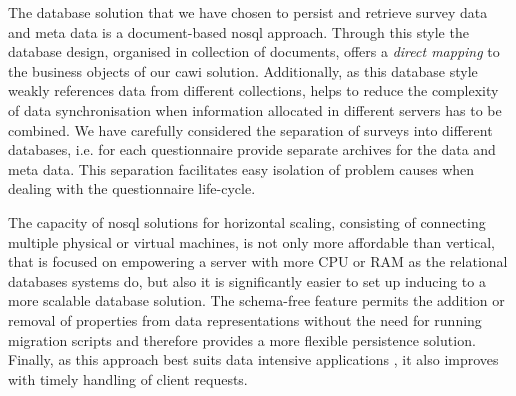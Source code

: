 	The database solution that we have chosen to persist and retrieve survey data and meta data is a document-based \gls{nosql} approach. Through this style the database design, organised in collection of documents, offers a \emph{direct mapping} to the business objects of our \gls{cawi} solution. Additionally, as this database style weakly references data from different collections, helps to reduce the complexity of data synchronisation when information allocated in different servers has to be combined. We have carefully considered the separation of surveys into different databases, i.e. for each questionnaire provide separate archives for the data and meta data. This separation facilitates easy isolation of problem causes when dealing with the questionnaire life-cycle.

	The capacity of \gls{nosql} solutions for horizontal scaling, consisting of connecting multiple physical or virtual machines, is not only more affordable than vertical, that is focused on empowering a server with more CPU or RAM as the relational databases systems do, but also it is significantly easier to set up inducing to a more scalable database solution. %
	The schema-free feature permits the addition or removal of properties from data representations without the need for running migration scripts \cite{art:padhy11} and therefore provides a more flexible persistence solution. Finally, as this approach best suits data intensive applications \cite{proc:gyorodi15}, it also improves with timely handling of client requests.